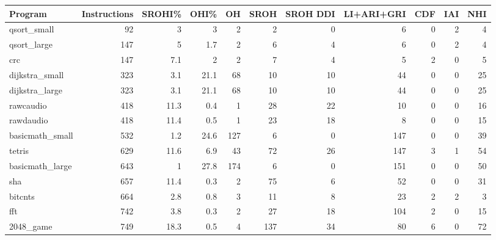 \begin{tabular}{|l|r|r|r|r|r|r|r|r|r|r|}
\hline
 Program         &   Instructions &   SROHI\% &   OHI\% &   OH &   SROH &   SROH DDI &   LI+ARI+GRI &   CDF &   IAI &   NHI \\
\hline
 qsort\_small     &             92 &      3   &    3   &    2 &      2 &          0 &            6 &     0 &     2 &     4 \\
\hline
 qsort\_large     &            147 &      5   &    1.7 &    2 &      6 &          4 &            6 &     0 &     2 &     4 \\
\hline
 crc             &            147 &      7.1 &    2   &    2 &      7 &          4 &            5 &     2 &     0 &     5 \\
\hline
 dijkstra\_small  &            323 &      3.1 &   21.1 &   68 &     10 &         10 &           44 &     0 &     0 &    25 \\
\hline
 dijkstra\_large  &            323 &      3.1 &   21.1 &   68 &     10 &         10 &           44 &     0 &     0 &    25 \\
\hline
 rawcaudio       &            418 &     11.3 &    0.4 &    1 &     28 &         22 &           10 &     0 &     0 &    16 \\
\hline
 rawdaudio       &            418 &     11.4 &    0.5 &    1 &     23 &         18 &            8 &     0 &     0 &    15 \\
\hline
 basicmath\_small &            532 &      1.2 &   24.6 &  127 &      6 &          0 &          147 &     0 &     0 &    39 \\
\hline
 tetris          &            629 &     11.6 &    6.9 &   43 &     72 &         26 &          147 &     3 &     1 &    54 \\
\hline
 basicmath\_large &            643 &      1   &   27.8 &  174 &      6 &          0 &          151 &     0 &     0 &    50 \\
\hline
 sha             &            657 &     11.4 &    0.3 &    2 &     75 &          6 &           52 &     0 &     0 &    31 \\
\hline
 bitcnts         &            664 &      2.8 &    0.8 &    3 &     11 &          8 &           23 &     2 &     2 &     3 \\
\hline
 fft             &            742 &      3.8 &    0.3 &    2 &     27 &         18 &          104 &     2 &     0 &    15 \\
\hline
 2048\_game       &            749 &     18.3 &    0.5 &    4 &    137 &         34 &           80 &     6 &     0 &    72 \\

\end{tabular}
